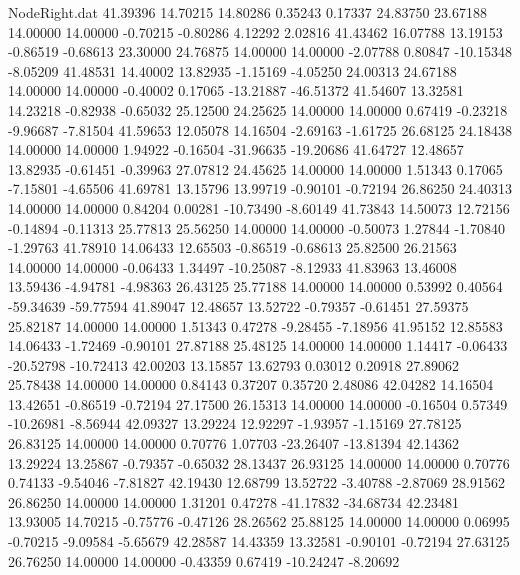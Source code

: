 \begin{filecontents}{NodeRight.dat}
  41.39396   14.70215   14.80286     0.35243    0.17337   24.83750   23.67188   14.00000   14.00000   -0.70215   -0.80286    4.12292    2.02816
  41.43462   16.07788   13.19153    -0.86519   -0.68613   23.30000   24.76875   14.00000   14.00000   -2.07788    0.80847  -10.15348   -8.05209
  41.48531   14.40002   13.82935    -1.15169   -4.05250   24.00313   24.67188   14.00000   14.00000   -0.40002    0.17065  -13.21887  -46.51372
  41.54607   13.32581   14.23218    -0.82938   -0.65032   25.12500   24.25625   14.00000   14.00000    0.67419   -0.23218   -9.96687   -7.81504
  41.59653   12.05078   14.16504    -2.69163   -1.61725   26.68125   24.18438   14.00000   14.00000    1.94922   -0.16504  -31.96635  -19.20686
  41.64727   12.48657   13.82935    -0.61451   -0.39963   27.07812   24.45625   14.00000   14.00000    1.51343    0.17065   -7.15801   -4.65506
  41.69781   13.15796   13.99719    -0.90101   -0.72194   26.86250   24.40313   14.00000   14.00000    0.84204    0.00281  -10.73490   -8.60149
  41.73843   14.50073   12.72156    -0.14894   -0.11313   25.77813   25.56250   14.00000   14.00000   -0.50073    1.27844   -1.70840   -1.29763
  41.78910   14.06433   12.65503    -0.86519   -0.68613   25.82500   26.21563   14.00000   14.00000   -0.06433    1.34497  -10.25087   -8.12933
  41.83963   13.46008   13.59436    -4.94781   -4.98363   26.43125   25.77188   14.00000   14.00000    0.53992    0.40564  -59.34639  -59.77594
  41.89047   12.48657   13.52722    -0.79357   -0.61451   27.59375   25.82187   14.00000   14.00000    1.51343    0.47278   -9.28455   -7.18956
  41.95152   12.85583   14.06433    -1.72469   -0.90101   27.87188   25.48125   14.00000   14.00000    1.14417   -0.06433  -20.52798  -10.72413
  42.00203   13.15857   13.62793     0.03012    0.20918   27.89062   25.78438   14.00000   14.00000    0.84143    0.37207    0.35720    2.48086
  42.04282   14.16504   13.42651    -0.86519   -0.72194   27.17500   26.15313   14.00000   14.00000   -0.16504    0.57349  -10.26981   -8.56944
  42.09327   13.29224   12.92297    -1.93957   -1.15169   27.78125   26.83125   14.00000   14.00000    0.70776    1.07703  -23.26407  -13.81394
  42.14362   13.29224   13.25867    -0.79357   -0.65032   28.13437   26.93125   14.00000   14.00000    0.70776    0.74133   -9.54046   -7.81827
  42.19430   12.68799   13.52722    -3.40788   -2.87069   28.91562   26.86250   14.00000   14.00000    1.31201    0.47278  -41.17832  -34.68734
  42.23481   13.93005   14.70215    -0.75776   -0.47126   28.26562   25.88125   14.00000   14.00000    0.06995   -0.70215   -9.09584   -5.65679
  42.28587   14.43359   13.32581    -0.90101   -0.72194   27.63125   26.76250   14.00000   14.00000   -0.43359    0.67419  -10.24247   -8.20692

\end{filecontents}
